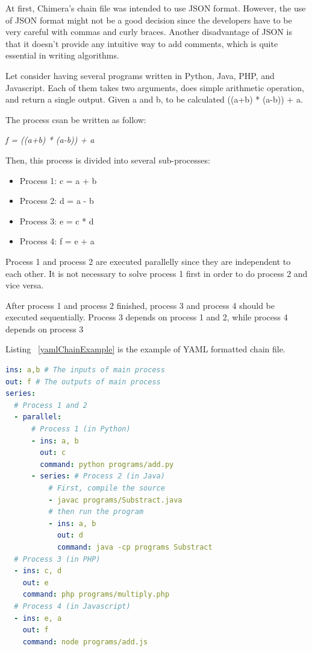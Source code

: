 \documentclass[conference]{IEEEtran}
\begin{document}
At first, Chimera's chain file was intended to use JSON format. However, the use of JSON format might not be a good decision since the developers have to be very 
careful with commas and curly braces. Another disadvantage
of JSON is that it doesn't provide any intuitive way to add comments, which is quite
essential in writing algorithms.

Let consider having several programs written in Python, Java, PHP, and Javascript. 
Each of them takes two arguments, does simple arithmetic operation, and return a single output. 
Given a and b, to be calculated ((a+b) * (a-b)) + a.

The process csan be written as follow:

{\it f = ((a+b) * (a-b)) + a}

Then, this process is divided into several sub-processes:

\begin{itemize}
    \item Process 1: c = a + b
    \item Process 2: d = a - b
    \item Process 3: e = c * d
    \item Process 4: f = e + a
\end{itemize}

Process 1 and process 2 are executed parallelly since they are independent to each other. 
It is not necessary to solve process 1 first in order to do process 2 and vice versa.

After process 1 and process 2 finished, process 3 and process 4 should be executed sequentially. 
Process 3 depends on process 1 and 2, while process 4 depends on process 3

Listing ~\ref{yamlChainExample} is the example of YAML formatted chain file.

\begin{lstlisting}[caption=YAML Chain Example, label=yamlChainExample, language=yaml, basicstyle=\small, breaklines=true]
ins: a,b # The inputs of main process 
out: f # The outputs of main process 
series:
  # Process 1 and 2 
  - parallel:
      # Process 1 (in Python) 
      - ins: a, b
        out: c
        command: python programs/add.py
      - series: # Process 2 (in Java) 
          # First, compile the source  
          - javac programs/Substract.java
          # then run the program 
          - ins: a, b
            out: d
            command: java -cp programs Substract
  # Process 3 (in PHP) 
  - ins: c, d
    out: e
    command: php programs/multiply.php
  # Process 4 (in Javascript) 
  - ins: e, a
    out: f
    command: node programs/add.js
\end{lstlisting}
\end{document}
